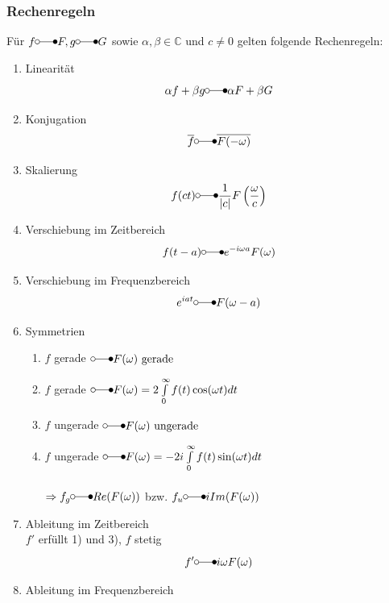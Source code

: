 \documentclass[a4paper,twocolumn,10pt]{article}
\begin{document}
\subsubsection{Rechenregeln}
Für $f\laplace F, g\laplace G$ sowie $\alpha,\beta\in\mathbb{C}$ und $c\neq 0$ gelten folgende Rechenregeln:
\begin{enumerate}[label=$\bullet$]
\item Linearität
\begin{equation*}
\alpha f+\beta g\laplace \alpha F+\beta G
\end{equation*}
\item Konjugation
\begin{equation*}
\overline{f}\laplace \overline{F(-\omega)}
\end{equation*}
\item Skalierung
\begin{equation*}
f(ct)\laplace \frac{1}{|c|}F\left(\frac{\omega}{c}\right)
\end{equation*}
\item Verschiebung im Zeitbereich
\begin{equation*}
f(t-a)\laplace e^{-i\omega a} F(\omega)
\end{equation*}
\item Verschiebung im Frequenzbereich
\begin{equation*}
e^{ia t}\laplace F(\omega-a)
\end{equation*}
\item Symmetrien
\begin{enumerate}[label=-]
\item $f$ gerade $\laplace F(\omega)\text{ gerade}$
\item $f$ gerade $\laplace F(\omega)=2\int\limits_{0}^{\infty}f(t)\cos(\omega t)dt$
\item $f$ ungerade $\laplace F(\omega)\text{ ungerade}$
\item $f$ ungerade $\laplace F(\omega)=-2i\int\limits_{0}^{\infty}f(t)\sin(\omega t)dt$\\\\
$\Rightarrow f_g\laplace Re(F(\omega))$ bzw. $f_u\laplace iIm(F(\omega))$
\end{enumerate}
\item Ableitung im Zeitbereich\\
$f'$ erfüllt 1) und 3), $f$ stetig
\begin{equation*}
f'\laplace i\omega F(\omega)
\end{equation*}
\item Ableitung im Frequenzbereich\\

\end{enumerate}
\end{document}
